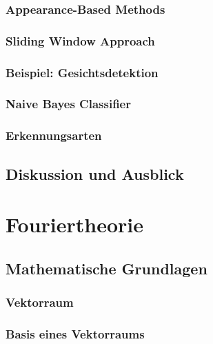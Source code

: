 \documentclass[a4paper, 11pt, accentcolor = tud3b]{tudreport}
\begin{document}
			\subsection{Appearance-Based Methods} %

			\subsection{Sliding Window Approach} %

			\subsection{Beispiel: Gesichtsdetektion} %

			\subsection{Naive Bayes Classifier} %

			\subsection{Erkennungsarten} %

		\section{Diskussion und Ausblick} %

	\chapter{Fouriertheorie} %

		\section{Mathematische Grundlagen} %

			\subsection{Vektorraum} %

			\subsection{Basis eines Vektorraums} %
\end{document}
